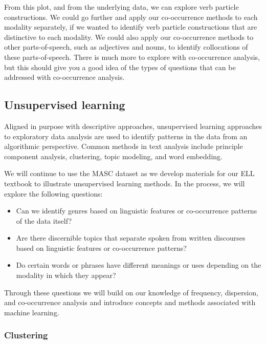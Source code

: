\documentclass[
  letterpaper,
  DIV=11,
  numbers=noendperiod]{scrreport}
\providecommand{\tightlist}{%
  \setlength{\itemsep}{0pt}\setlength{\parskip}{0pt}}\usepackage{longtable,booktabs,array}
\theoremstyle{definition}
\theoremstyle{remark}
\begin{document}
From this plot, and from the underlying data, we can explore verb
particle constructions. We could go further and apply our co-occurrence
methods to each modality separately, if we wanted to identify verb
particle constructions that are distinctive to each modality. We could
also apply our co-occurrence methods to other parts-of-speech, such as
adjectives and nouns, to identify collocations of these parts-of-speech.
There is much more to explore with co-occurrence analysis, but this
should give you a good idea of the types of questions that can be
addressed with co-occurrence analysis.

\hypertarget{sec-eda-unsupervised}{%
\subsection{Unsupervised learning}\label{sec-eda-unsupervised}}

Aligned in purpose with descriptive approaches, unsupervised learning
approaches to exploratory data analysis are used to identify patterns in
the data from an algorithmic perspective. Common methods in text
analysis include principle component analysis, clustering, topic
modeling, and word embedding.

We will continue to use the MASC dataset as we develop materials for our
ELL textbook to illustrate unsupervised learning methods. In the
process, we will explore the following questions:

\begin{itemize}
\tightlist
\item
  Can we identify genres based on linguistic features or co-occurrence
  patterns of the data itself?
\item
  Are there discernible topics that separate spoken from written
  discourses based on linguistic features or co-occurrence patterns?
\item
  Do certain words or phrases have different meanings or uses depending
  on the modality in which they appear?
\end{itemize}

Through these questions we will build on our knowledge of frequency,
dispersion, and co-occurrence analysis and introduce concepts and
methods associated with machine learning.

\hypertarget{sec-eda-clustering}{%
\subsubsection{Clustering}\label{sec-eda-clustering}}
\end{document}
